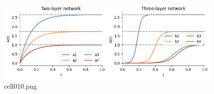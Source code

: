 \begin{figure}[ht]
	\centering
	\includegraphics[scale=0.8, max width=\linewidth]{./fig/solve-credit-assignment-problem/linear-network-learning-dynamics/cell010.png}
	\caption{cell010.png}
	\label{cell010.png}
\end{figure}